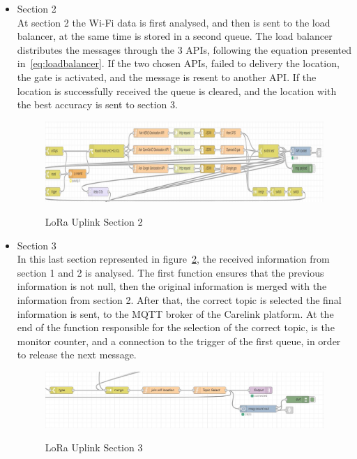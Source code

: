 \begin{itemize}
\begin{itemize}
  \item Section 2\\
    At section 2 the Wi-Fi data is first analysed, and then is sent to the load balancer, at the same time is stored in a second queue. The load balancer distributes the messages through the 3 APIs, following the equation presented in~\ref{eq:loadbalancer}. If the two chosen APIs, failed to delivery the location, the gate is activated, and the message is resent to another API. If the location is successfully received the queue is cleared, and the location with the best accuracy is sent to section 3.
    \begin{figure}[htbp]
      \centering
     
        {\includegraphics[width=\linewidth]{Chapters/Figures/sec2.png}}
    
      \caption{LoRa Uplink  Section 2}
      \label{fig:LoRa_Uplink_Sec2}
    \end{figure}
\end{itemize}

\begin{itemize}
  \item Section 3\\
  In this last section represented in figure~\ref{fig:LoRa_Uplink_Sec3}, the received information from section 1 and 2 is analysed. The first function ensures that the previous information is not null, then the original information is merged  with the information from section 2. After that, the correct topic is selected  the final information is sent, to the MQTT broker of the Carelink platform. At the end of the function responsible for the selection of the correct topic, is the monitor counter, and a connection to the trigger of the first queue, in order to release the next message.
  
    \begin{figure}[htbp]
      \centering
    
        {\includegraphics[width=\linewidth]{Chapters/Figures/section3.JPG}}
     
      \caption{LoRa Uplink Section 3}
      \label{fig:LoRa_Uplink_Sec3}
    \end{figure}
\end{itemize}

\end{itemize}


